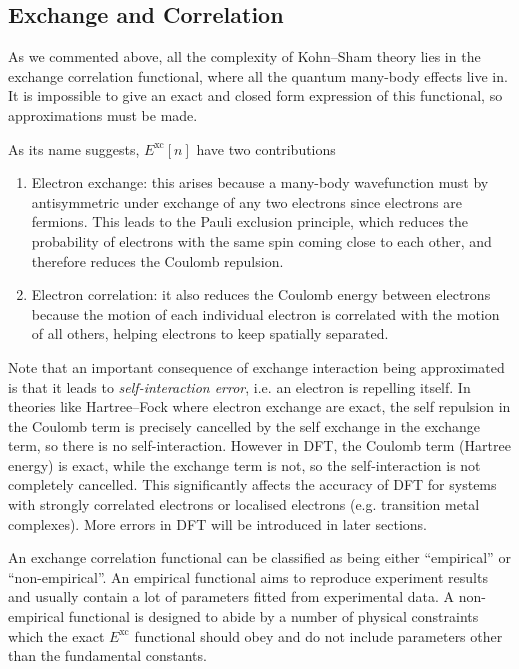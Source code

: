 \documentclass{article}
\theoremstyle{plain}\theoremheaderfont{\normalfont\itshape}\theorembodyfont{\rmfamily}\theoremseparator{.}\newtheorem*{rem}{Remark}\newtheorem*{ex}{Example}\newtheorem*{proof}{Proof}\newtheorem*{altp}{Alternative proof}
\theoremstyle{plain}\theoremheaderfont{\normalfont\bfseries}\theorembodyfont{\rmfamily}\theoremseparator{.}\newtheorem{thm}{Theorem}[section]\newtheorem{lem}[thm]{Lemma}\newtheorem{prop}[thm]{Proposition}\newtheorem*{cor}{Corollary}\newtheorem{defn}[thm]{Definition}\newtheorem{clm}[thm]{Claim}\newtheorem{clminproof}{Claim}\newtheorem{pos}{Postulate}[section]
\theoremstyle{break}\theoremheaderfont{\normalfont\itshape}\theorembodyfont{\rmfamily}\theoremseparator{.\medskip}\newtheorem*{proofskip}{Proof}\newtheorem*{exs}{Examples}\newtheorem*{rems}{Remarks}
\theoremstyle{break}\theoremheaderfont{\normalfont\bfseries}\theorembodyfont{\rmfamily}\theoremseparator{.\medskip}\newtheorem{lemskip}[thm]{Lemma}\newtheorem{defnskip}[thm]{Definition}\newtheorem{propskip}[thm]{Proposition}\newtheorem{thmskip}[thm]{Theorem}
\numberwithin{equation}{section}
\begin{document}
    \subsection{Exchange and Correlation}
    As we commented above, all the complexity of Kohn--Sham theory lies in the exchange correlation functional, where all the quantum many-body effects live in. It is impossible to give an exact and closed form expression of this functional, so approximations must be made.

    As its name suggests, \(E^{\text{xc}}[n]\) have two contributions
    \begin{enumerate}[topsep=0pt,label=(\roman*)]
        \item Electron exchange: this arises because a many-body wavefunction must by antisymmetric under exchange of any two electrons since electrons are fermions. This leads to the Pauli exclusion principle, which reduces the probability of electrons with the same spin coming close to each other, and therefore reduces the Coulomb repulsion.
        \item Electron correlation: it also reduces the Coulomb energy between electrons because the motion of each individual electron is correlated with the motion of all others, helping electrons to keep spatially separated.
    \end{enumerate}

    Note that an important consequence of exchange interaction being approximated is that it leads to \textit{self-interaction error}, i.e. an electron is repelling itself. In theories like Hartree--Fock where electron exchange are exact, the self repulsion in the Coulomb term is precisely cancelled by the self exchange in the exchange term, so there is no self-interaction. However in DFT, the Coulomb term (Hartree energy) is exact, while the exchange term is not, so the self-interaction is not completely cancelled. This significantly affects the accuracy of DFT for systems with strongly correlated electrons or localised electrons (e.g. transition metal complexes). More errors in DFT will be introduced in later sections.

    An exchange correlation functional can be classified as being either ``empirical'' or ``non-empirical''. An empirical functional aims to reproduce experiment results and usually contain a lot of parameters fitted from experimental data. A non-empirical functional is designed to abide by a number of physical constraints which the exact \(E^{\text{xc}}\) functional should obey and do not include parameters other than the fundamental constants.
\end{document}
